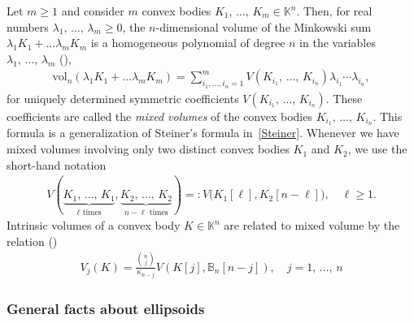 \documentclass[AHL,Unicode,longabstracts,published]{cedram}
\newcommand{\rvol}{\mathrm{vol}}
\newcommand{\bbB}{\mathbb{B}}
\newcommand{\bbK}{\mathbb{K}}
\begin{document}
Let $m \geq 1$ and consider $m$ convex bodies $K_1,\,\ldots,\,K_m \in \bbK^n$. Then, for real numbers $\lambda_1,\,\ldots,\,\lambda_m \geq0$, the $n$-dimensional volume of the Minkowski sum $\lambda_1K_1+\ldots \lambda_mK_m$ is a homogeneous polynomial of degree $n$ in the variables $\lambda_1,\,\ldots,\,\lambda_m$ (\cite[Eq.~(14.7)]{Schneider}),
\begin{gather*}
\rvol_n(\lambda_1K_1+\ldots \lambda_mK_m) = \sum_{i_1,\ldots,i_n=1}^m V(K_{i_1},\,\ldots,\,K_{i_n}) \lambda_{i_1}\cdots \lambda_{i_n},
\end{gather*}
for uniquely determined symmetric coefficients $V(K_{i_1},\,\ldots,\,K_{i_n})$. These coefficients are called the \emph{mixed volumes} of the convex bodies $K_{i_1},\,\ldots,\,K_{i_n}$. This formula is a generalization of Steiner's formula in~\eqref{Steiner}. Whenever we have mixed volumes involving only two distinct convex bodies $K_1$ and $K_2$, we use the short-hand notation
\begin{gather}\label{Eq:NotationVol}
V(\underbrace{K_1,\,\ldots,\,K_1}_{\ell \textrm{ times}},
\underbrace{K_2,\,\ldots,\,K_2}_{n-\ell \textrm{ times}}) =: V\big(K_1[\ell],K_2[n-\ell]\big), \quad \ell \geq1.
\end{gather}
Intrinsic volumes of a convex body $K \in \bbK^n$ are related to mixed volume by the relation (\cite[Eq.~(14.18)]{Schneider})
\begin{gather}\label{IntMix}
V_j(K) = \frac{\binom{n}{j}}{\kappa_{n-j}} V(K[j],\bbB_n[n-j]), \quad j=1,\,\ldots,\,n
\end{gather}

\subsubsection*{General facts about ellipsoids}
\end{document}
